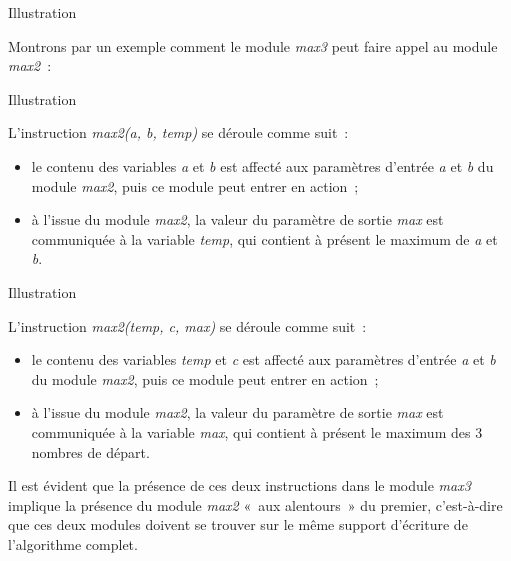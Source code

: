 \begin{frame}{Illustration}

	Montrons par un exemple comment le module
	\textit{{max3}}
	peut faire appel au module
	\textit{{max2}}~:

	\bigskip
	
\end{frame}

\begin{frame}{Illustration}
	
	L’instruction
	\textit{{max2(a, b,
	temp)}} se déroule comme suit~:
	
	\begin{itemize}
	\item {
	{le contenu des variables
	}\textit{{a}}{
	et
	}\textit{{b}}{
	est affecté aux paramètres d’entrée
	}\textit{{a}}{
	et
	}\textit{{b}}{
	du module
	}\textit{{max2}}{,
	puis ce module peut entrer en action~;}}
	\item {
	{à l’issue du module
	}\textit{{max2}}{,
	la valeur du paramètre de sortie
	}\textit{{max}}{
	est communiquée à la variable
	}\textit{{temp}}{,
	qui contient à présent le maximum de
	}\textit{{a}}{
	et
	}\textit{{b}}{.}}
	\end{itemize}
\end{frame}

\begin{frame}{Illustration}
	
	L’instruction \textit{max2(temp, c, max)}
	se déroule comme suit~:
	
	\begin{itemize}
	\item {
	{le contenu des variables
	}\textit{{temp}}{
	et
	}\textit{{c}}{
	est affecté aux paramètres d’entrée
	}\textit{{a}}{
	et
	}\textit{{b}}{
	du module
	}\textit{{max2}}{,
	puis ce module peut entrer en action~;}}
	\item {
	{à l’issue du module
	}\textit{{max2}}{,
	la valeur du paramètre de sortie
	}\textit{{max}}{
	est communiquée à la variable
	}\textit{{max}}{,
	qui contient à présent le maximum des 3 nombres de départ.}}
	\end{itemize}

	{Il est évident que la présence de ces deux
	instructions dans le module
	}\textit{{max3}}{
	implique la présence du module
	}\textit{{max2}}{
	«~aux alentours~» du premier, c’est-à-dire que ces deux modules doivent
	se trouver sur le même support d’écriture de
	l'algorithme complet.}
\end{frame}

